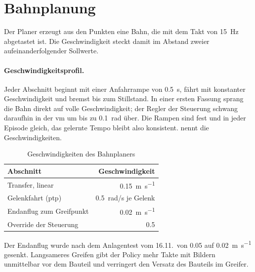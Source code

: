 \section{Bahnplanung}
\label{sec:bahnplanung}

Der Planer erzeugt aus den Punkten eine Bahn, die mit dem Takt von \SI{15}{\hertz} abgetastet
ist. Die Geschwindigkeit steckt damit im Abstand zweier aufeinanderfolgender Sollwerte.

\paragraph{Geschwindigkeitsprofil.} Jeder Abschnitt beginnt mit einer Anfahrrampe von
\SI{0.5}{\second}, fährt mit konstanter Geschwindigkeit und bremst bis zum Stillstand. In
einer ersten Fassung sprang die Bahn direkt auf volle Geschwindigkeit; der Regler der
Steuerung schwang daraufhin in der \ac{vm} um bis zu \SI{0.1}{rad} über. Die Rampen sind fest
und in jeder Episode gleich, das gelernte Tempo bleibt also konsistent.
 nennt die Geschwindigkeiten.

\begin{table}[htbp]
  \centering
  \caption{Geschwindigkeiten des Bahnplaners}
  \label{tab:geschwindigkeiten}
  \begin{tabular}{@{}l r@{}}
    \toprule
    Abschnitt & Geschwindigkeit \\
    \midrule
    Transfer, linear & \SI{0.15}{\metre\per\second} \\
    Gelenkfahrt (\acs{ptp}) & \SI{0.5}{rad/s} je Gelenk \\
    Endanflug zum Greifpunkt & \SI{0.02}{\metre\per\second} \\
    Override der Steuerung & \num{0.5} \\
    \bottomrule
  \end{tabular}
\end{table}

Der Endanflug wurde nach dem Anlagentest vom 16.11.\ von \SI{0.05}{} auf
\SI{0.02}{\metre\per\second} gesenkt. Langsameres Greifen gibt der Policy mehr Takte mit
Bildern unmittelbar vor dem Bauteil und verringert den Versatz des Bauteils im Greifer.

